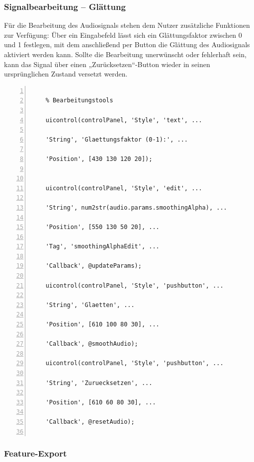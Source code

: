 \subsubsection{Signalbearbeitung – Glättung}

Für die Bearbeitung des Audiosignals stehen dem Nutzer zusätzliche Funktionen zur Verfügung: Über ein Eingabefeld lässt sich ein Glättungsfaktor zwischen 0 und 1 festlegen, mit dem anschließend per Button die Glättung des Audiosignals aktiviert werden kann. Sollte die Bearbeitung unerwünscht oder fehlerhaft sein, kann das Signal über einen „Zurücksetzen“-Button wieder in seinen ursprünglichen Zustand versetzt werden. \cite{Hossain:2025} \cite{MathWorks:2025ModelCallbacks}

\begin{lstlisting}[frame=single, numbers=left, style=Matlab-Pyglike]
    
    % Bearbeitungstools
    
    uicontrol(controlPanel, 'Style', 'text', ...
    
    'String', 'Glaettungsfaktor (0-1):', ...
    
    'Position', [430 130 120 20]);
    
    
    uicontrol(controlPanel, 'Style', 'edit', ...
    
    'String', num2str(audio.params.smoothingAlpha), ...
    
    'Position', [550 130 50 20], ...
    
    'Tag', 'smoothingAlphaEdit', ...
    
    'Callback', @updateParams);
    
    uicontrol(controlPanel, 'Style', 'pushbutton', ...
    
    'String', 'Glaetten', ...
    
    'Position', [610 100 80 30], ...
    
    'Callback', @smoothAudio);
    
    uicontrol(controlPanel, 'Style', 'pushbutton', ...
    
    'String', 'Zuruecksetzen', ...
    
    'Position', [610 60 80 30], ...
    
    'Callback', @resetAudio);
    
\end{lstlisting}

\subsubsection{Feature-Export}

